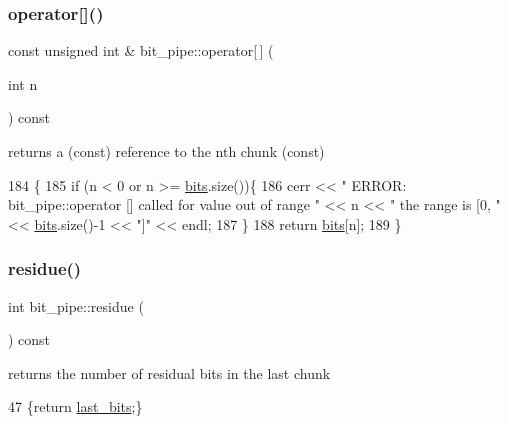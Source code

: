 \subsubsection{\texorpdfstring{operator[]()}{operator[]()}\hspace{0.1cm}{\footnotesize\ttfamily [2/2]}}
{\footnotesize\ttfamily const unsigned int \& bit\+\_\+pipe\+::operator\mbox{[}$\,$\mbox{]} (\begin{DoxyParamCaption}\item[{int}]{n }\end{DoxyParamCaption}) const}



returns a (const) reference to the nth chunk (const) 


\begin{DoxyCode}
184                                                    \{
185   \textcolor{keywordflow}{if} (n < 0 or n >= \hyperlink{classbit__pipe_a86f38af1e9736b053728033490476b50}{bits}.size())\{
186     cerr << \textcolor{stringliteral}{" ERROR: bit\_pipe::operator [] called for value out of range "} << n << \textcolor{stringliteral}{" the range is [0, "} << 
      \hyperlink{classbit__pipe_a86f38af1e9736b053728033490476b50}{bits}.size()-1 << \textcolor{stringliteral}{"]"} << endl;
187   \}
188   \textcolor{keywordflow}{return} \hyperlink{classbit__pipe_a86f38af1e9736b053728033490476b50}{bits}[n];
189 \}
\end{DoxyCode}
\mbox{\label{classbit__pipe_a283f47fa4422ac50b9b28e8f276f7252}} 
\subsubsection{\texorpdfstring{residue()}{residue()}}
{\footnotesize\ttfamily int bit\+\_\+pipe\+::residue (\begin{DoxyParamCaption}{ }\end{DoxyParamCaption}) const\hspace{0.3cm}{\ttfamily [inline]}}



returns the number of residual bits in the last chunk 


\begin{DoxyCode}
47 \{\textcolor{keywordflow}{return} \hyperlink{classbit__pipe_a0f3e84b02751803adaab499b5dad86fe}{last\_bits};\}
\end{DoxyCode}
\mbox{\label{classbit__pipe_a148fab2b6b3ee730fbaa52539d5a4d74}} 

